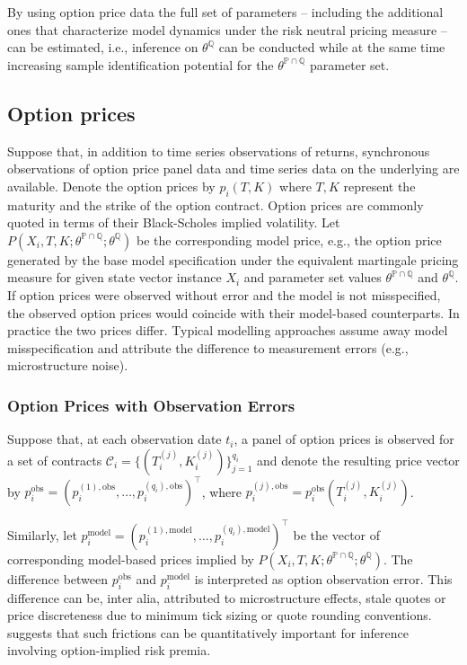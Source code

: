 \documentclass[11pt,a4paper,notitlepage]{article}
\numberwithin{equation}{section}
\begin{document}
By using option price data the full set of parameters -- including the additional ones that characterize model dynamics under the risk neutral pricing measure -- can be estimated, i.e., inference on $\theta^\mathbb{Q}$ can be conducted while at the same time increasing sample identification potential for the $\theta^{\mathbb{P} \cap \mathbb{Q}}$ parameter set. 

\subsection{Option prices}
Suppose that, in addition to time series observations of returns, synchronous observations of option price panel data and time series data on the underlying are available. Denote the option prices by $p_{i}(T,K)$ where $T,K$ represent the maturity and the strike of the option contract. Option prices are commonly quoted in terms of their Black-Scholes implied volatility. Let $P(X_{i},T,K; \theta^{\mathbb{P}\cap\mathbb{Q}}; \theta^\mathbb{Q})$ be the corresponding model price, e.g., the option price generated by the base model specification under the equivalent martingale pricing measure for  given state vector instance $X_{i}$ and parameter set values $\theta^{\mathbb{P}\cap\mathbb{Q}}$ and $\theta^\mathbb{Q}$. If option prices were observed without error and the model is not misspecified, the observed option prices would coincide with their model-based counterparts. In practice the two prices differ. Typical modelling approaches assume away model misspecification and attribute the difference to measurement errors (e.g., microstructure noise). 

\subsubsection{Option Prices with Observation Errors}
Suppose that, at each observation date $t_i$, a panel of option prices is observed for a set of contracts
$\mathcal{C}_i=\{(T_i^{(j)},K_i^{(j)})\}_{j=1}^{q_i}$ and denote the resulting price vector by
$p_i^{\mathrm{obs}}=\left(p_i^{(1),\mathrm{obs}},\dots,p_i^{(q_i),\mathrm{obs}}\right)^\top$, where
$p_i^{(j),\mathrm{obs}}=p_i^{\mathrm{obs}}(T_i^{(j)},K_i^{(j)})$. 

Similarly, let
$p_i^{\mathrm{model}}=\left(p_i^{(1),\mathrm{model}},\dots,p_i^{(q_i),\mathrm{model}}\right)^\top$
be the vector of corresponding model-based prices implied by $P(X_i,T,K;\theta^{\mathbb{P}\cap\mathbb{Q}};\theta^\mathbb{Q})$.
The difference between $p_i^{\mathrm{obs}}$ and $p_i^{\mathrm{model}}$ is interpreted as option observation error.
This difference can be, inter alia, attributed to microstructure effects, stale quotes or price discreteness due to minimum tick sizing or quote rounding conventions. \citet{duarte2024very}
suggests that such frictions can be quantitatively important for inference involving option-implied risk premia. 
 
\end{document}

